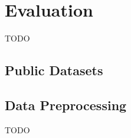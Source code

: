 \section{Evaluation}
\label{section:evaluation}

TODO

\subsection{Public Datasets}
\label{subsection:publicdatasets}

\subsection{Data Preprocessing}
\label{subsection:preprocessing}

TODO